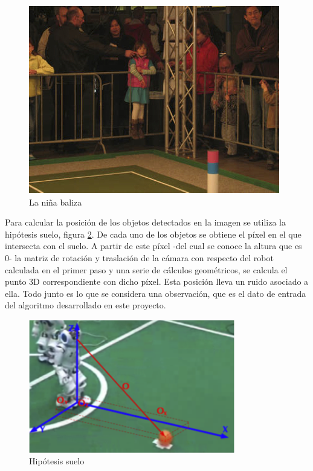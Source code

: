 \begin{figure} [h]
  \begin{center}
    \includegraphics[]{img/cap3/nina_baliza}
  \end{center}
  \caption{La niña baliza}
  \label{fig:ninabaliza}
\end{figure}

Para calcular la posición de los objetos detectados en la imagen se utiliza la hipótesis suelo, figura \ref{fig:hipotesis-suelo}. De cada uno de los objetos se obtiene el píxel en el que intersecta con el suelo. A partir de este píxel -del cual se conoce la altura que es 0- la matriz de rotación y traslación de la cámara con respecto del robot calculada en el primer paso y una serie de cálculos geométricos, se calcula el punto 3D correspondiente con dicho píxel. Esta posición lleva un ruido asociado a ella. Todo junto es lo que se considera una observación, que es el dato de entrada del algoritmo desarrollado en este proyecto. \\

\begin{figure} [h]
  \begin{center}
    \includegraphics[width=9cm]{img/cap3/hipotesis_suelo}
  \end{center}
  \caption{Hipótesis suelo}
  \label{fig:hipotesis-suelo}
\end{figure}

